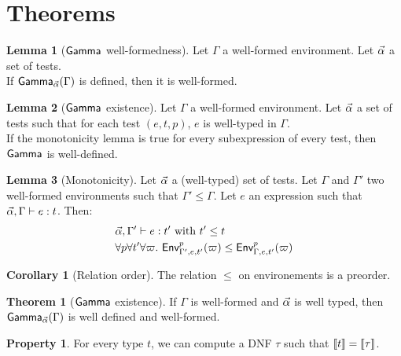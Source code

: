 \documentclass[a4paper]{article}
\theoremstyle{definition}
\newtheorem{theorem}{Theorem}
\newtheorem{lemma}{Lemma}
\newtheorem{property}{Property}
\newtheorem{corollary}{Corollary}
\begin{document}
    \section{Theorems}

        \begin{lemma}[$\textsf{Gamma}_{} $ well-formedness]
          Let $\Gamma$ a well-formed environment. Let $\vec \alpha$ a set of tests.\\
          If $\textsf{Gamma}_{\vec \alpha}(\Gamma)$ is defined, then it is well-formed.
        \end{lemma}
    
        \begin{lemma}[$\textsf{Gamma}_{} $ existence]
          Let $\Gamma$ a well-formed environment. Let $\vec \alpha$ a set of tests such that for each test $(e,t,p)$, $e$ is well-typed in $\Gamma$.\\
          If the monotonicity lemma is true for every subexpression of every test, then $\textsf{Gamma}_{}$ is well-defined.
        \end{lemma}

        \begin{lemma}[Monotonicity]
          Let $\vec \alpha$ a (well-typed) set of tests.
          Let $\Gamma$ and $\Gamma'$ two well-formed environments such that $\Gamma' \leq \Gamma$.
          Let $e$ an expression such that $\vec \alpha, \Gamma \vdash e:t$.
          Then:\\
          \begin{align*}
            &\vec \alpha, \Gamma' \vdash e:t' \text{ with } t' \leq t\\
            &\forall p \forall t' \forall \varpi.\ \textsf{Env}^{p}_{\Gamma',e,t'} (\varpi) \leq \textsf{Env}^{p}_{\Gamma,e,t'} (\varpi)
          \end{align*}
        \end{lemma}

        \begin{corollary}[Relation order]
          The relation $\leq$ on environements is a preorder.
        \end{corollary}

        \begin{theorem}[$\textsf{Gamma}_{}$ existence]
            If $\Gamma$ is well-formed and $\vec \alpha$ is well typed, then $\textsf{Gamma}_{\vec \alpha}(\Gamma)$ is well defined and well-formed.
        \end{theorem}

        \begin{property}
          For every type $t$, we can compute a DNF $\tau$ such that ${\llbracket t \rrbracket} = {\llbracket \tau \rrbracket}$.
        \end{property}
\end{document}
